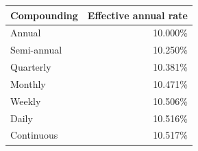 \begin{tabular}{lr}\toprule
Compounding & Effective annual rate\\\midrule
Annual & 10.000\%\\
Semi-annual & 10.250\%\\
Quarterly & 10.381\%\\
Monthly & 10.471\%\\
Weekly & 10.506\%\\
Daily & 10.516\%\\
Continuous & 10.517\%\\
\bottomrule\end{tabular}
